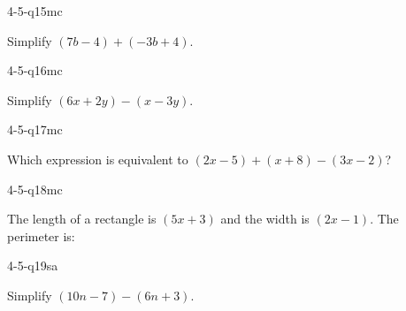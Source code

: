 \begin{practiceQuestion}{4-5-q15}{mc}
\begin{questionText}
Simplify $(7b - 4) + (-3b + 4)$.
\end{questionText}
\end{practiceQuestion}

\begin{practiceQuestion}{4-5-q16}{mc}
\begin{questionText}
Simplify $(6x + 2y) - (x - 3y)$.
\end{questionText}
\end{practiceQuestion}

\begin{practiceQuestion}{4-5-q17}{mc}
\begin{questionText}
Which expression is equivalent to $(2x - 5) + (x + 8) - (3x - 2)$?
\end{questionText}
\end{practiceQuestion}

\begin{practiceQuestion}{4-5-q18}{mc}
\begin{questionText}
The length of a rectangle is $(5x + 3)$ and the width is $(2x - 1)$. The perimeter is:
\end{questionText}
\end{practiceQuestion}


\begin{practiceQuestion}{4-5-q19}{sa}
\begin{questionText}
Simplify $(10n - 7) - (6n + 3)$.
\end{questionText}
\end{practiceQuestion}

